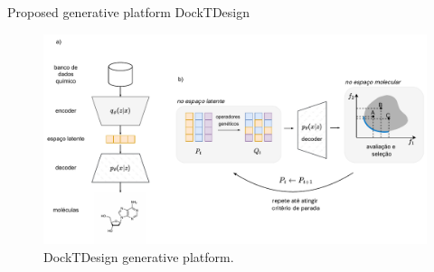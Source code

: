 \documentclass[aspectratio=169,xcolor=dvipsnames]{beamer}
\begin{document}



\begin{frame}{Proposed generative platform \hfill {\footnotesize \alert{DockTDesign}}}
    \begin{figure}
        \centering
        \includegraphics[width=.825\linewidth]{imgs/generative-framework.pdf}
        \vspace{-0.5em}
        \caption{DockTDesign generative platform.}
    \end{figure}
\end{frame}
\end{document}
